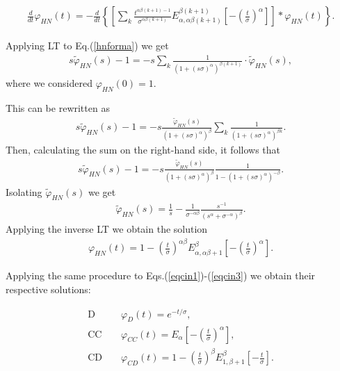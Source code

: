 \documentclass[12pt]{amsart}
\numberwithin{equation}{section}
\begin{document}
\begin{eqnarray}
\frac{d}{dt}\varphi_{HN}(t)=-\frac{d}{dt}\left\{\left[\sum_{k}\frac{t^{\alpha\beta(k+1)-1}}{\sigma^{\alpha\beta(k+1)}}E_{\alpha,\alpha\beta(k+1)}^{\beta(k+1)}\left[-\left(\frac{t}{\sigma}\right)^{\alpha}\right]\right]*\varphi_{HN}(t)\right\}.
\label{hnforma}
\end{eqnarray}

Applying LT to Eq.(\ref{hnforma}) we get 
\begin{eqnarray}
s\tilde{\varphi}_{HN}(s)-1=-s\sum_{k}\frac{1}{(1+(s\sigma)^{\alpha})^{\beta(k+1)}}\cdot\tilde{\varphi}_{HN}(s),
\end{eqnarray}
where we considered $\varphi_{HN}(0)=1$.

This can be rewritten as 
\begin{eqnarray}
s\tilde{\varphi}_{HN}(s)-1=-s\frac{\tilde{\varphi}_{HN}(s)}{(1+(s\sigma)^{\alpha})^{\beta}}\sum_{k}
\frac{1}{(1+(s\sigma)^{\alpha})^{\beta k}}.
\end{eqnarray}
Then, calculating the sum on the right-hand side, it follows that 
\begin{eqnarray}
s\tilde{\varphi}_{HN}(s)-1=-s\frac{\tilde{\varphi}_{HN}(s)}{(1+(s\sigma)^{\alpha})^{\beta}}
\frac{1}{1-(1+(s\sigma)^{\alpha})^{-\beta}}.
\end{eqnarray}
Isolating $\tilde{\varphi}_{HN}(s)$ we get 
\begin{eqnarray}
\tilde{\varphi}_{HN}(s)=\frac{1}{s}-\frac{1}{\sigma^{-\alpha \beta}}\frac{s^{-1}}{(s^{\alpha}+\sigma^{-\alpha})^{\beta}}.
\end{eqnarray}
Applying the inverse LT we obtain the solution 
\begin{eqnarray}
\varphi_{HN}(t)=1-\left(\frac{t}{\sigma}\right)^{\alpha\beta}E_{\alpha,\alpha\beta+1}^{\beta}\left[-
\left(\frac{t}{\sigma}\right)^{\alpha}\right].
\label{hncap3}
\end{eqnarray}

Applying the same procedure to Eqs.(\ref{eqcin1})-(\ref{eqcin3}) we obtain
their respective solutions:

\begin{eqnarray}
\mbox{D}&\,\,&\varphi_{D}(t)=e^{-t/\sigma},\label{debye0}\\
\mbox{CC}&\,\,&\varphi_{CC}(t)=E_{\alpha}\left[-\left(\frac{t}{\sigma}\right)^{\alpha}\right],\label{cc}\\
\mbox{CD}&\,\,&\varphi_{CD}(t)=1-\left(\frac{t}{\sigma}\right)^{\beta}E_{1,\beta+1}^{\beta}\left[-\frac{t}{\sigma}\right].\label{cd}
\end{eqnarray}
\end{document}
